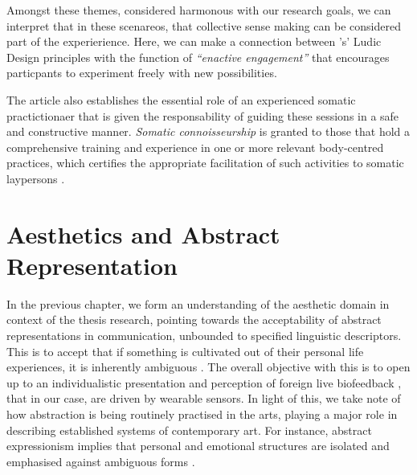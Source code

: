 Amongst these themes, considered harmonous with our research goals, we can interpret that in these scenareos, that collective sense making can be considered part of the experierience. Here, we can make a connection between \citeauthor{gaver_drift_2004}'s' Ludic Design principles \cite{gaver_drift_2004} with the function of \textit{``enactive engagement''} that encourages particpants to experiment freely with new possibilities.

The article also establishes the essential role of an experienced somatic practictionaer that is given the responsability of guiding these sessions in a safe and constructive manner. \textit{Somatic connoisseurship} is granted to those that hold a comprehensive training and experience in one or more relevant body-centred practices, which certifies the appropriate facilitation of such activities to somatic laypersons \cite{samaritter_aesthetic_2018}.


\section{Aesthetics and Abstract Representation}
\label{lit_review:abstract}

In the previous chapter, we form an understanding of the aesthetic domain in context of the thesis research, pointing towards the acceptability of abstract representations in communication, unbounded to specified linguistic descriptors. This is to accept that if something is cultivated out of their personal life experiences, it is inherently ambiguous \cite{kaplan_esthetic_1948}. The overall objective with this is to open up to an individualistic presentation and perception of foreign live biofeedback \cite{lux_live_2018}, that in our case, are driven by wearable sensors. In light of this, we take note of how abstraction is being routinely practised in the arts, playing a major role in describing established systems of contemporary art. For instance, abstract expressionism implies that personal and emotional structures are isolated and emphasised against ambiguous forms \cite{pollock_action_2008}.


